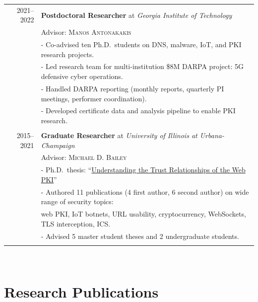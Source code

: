 \documentclass[10pt,singlecolumn]{article} %
\begin{document}
\begin{tabular}{rl}

2021--2022 & \textbf{Postdoctoral Researcher} at \emph{Georgia Institute of Technology}\\ 
& Advisor: \textsc{Manos Antonakakis} \\
& - Co-advised ten Ph.D.\ students on DNS, malware, IoT, and PKI research projects. \\
& - Led research team for multi-institution \$8M DARPA project: 5G defensive cyber operations. \\
& - Handled DARPA reporting (monthly reports, quarterly PI meetings, performer coordination). \\
& - Developed certificate data and analysis pipeline to enable PKI research. \\
\\

2015--2021 & \textbf{Graduate Researcher} at \emph{University of Illinois at Urbana-Champaign} \\ 
& Advisor: \textsc{Michael D. Bailey}\\
& - Ph.D.\ thesis: ``\href{https://zanema.com/papers/zane-dissertation.pdf}{Understanding the Trust Relationships of the Web PKI}''\\
& - Authored 11 publications (4 first author, 6 second author) on wide range of security topics: \\ 
&\quad web PKI, IoT botnets, URL usability, cryptocurrency, WebSockets, TLS interception, ICS. \\
& - Advised 5 master student theses and 2 undergraduate students. \\
\\

\end{tabular}\\



\section{Research Publications} 
\end{document}
